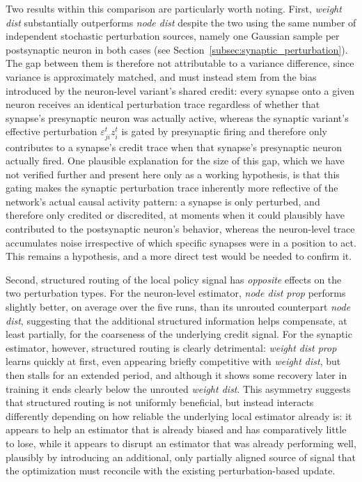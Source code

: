 Two results within this comparison are particularly worth noting. First, \emph{weight dist} substantially outperforms \emph{node dist} despite the two using the same
number of independent stochastic perturbation sources, namely one Gaussian sample per
postsynaptic neuron in both cases (see Section~\ref{subsec:synaptic_perturbation}). The gap
between them is therefore not attributable to a variance difference, since variance is
approximately matched, and must instead stem from the bias introduced by the neuron-level
variant's shared credit: every synapse onto a given neuron receives an identical
perturbation trace regardless of whether that synapse's presynaptic neuron was actually
active, whereas the synaptic variant's effective perturbation $\varepsilon^t_{ji}z^t_i$ is
gated by presynaptic firing and therefore only contributes to a synapse's credit trace when
that synapse's presynaptic neuron actually fired. One plausible explanation for the size of
this gap, which we have not verified further and present here only as a working hypothesis,
is that this gating makes the synaptic perturbation trace inherently more reflective of the
network's actual causal activity pattern: a synapse is only perturbed, and therefore only
credited or discredited, at moments when it could plausibly have contributed to the
postsynaptic neuron's behavior, whereas the neuron-level trace accumulates noise
irrespective of which specific synapses were in a position to act. This remains a hypothesis, and a more direct test would be needed to confirm it.

Second, structured routing of the local policy signal has \emph{opposite} effects on the two
perturbation types. For the neuron-level estimator, \emph{node dist prop} performs
slightly better, on average over the five runs, than its unrouted counterpart \emph{node
dist}, suggesting that the additional structured information helps compensate, at least
partially, for the coarseness of the underlying credit signal. For the synaptic estimator,
however, structured routing is clearly detrimental: \emph{weight dist prop} learns quickly
at first, even appearing briefly competitive with \emph{weight dist}, but then stalls
for an extended period, and although it shows some recovery later in training it ends clearly
below the unrouted \emph{weight dist}. This asymmetry suggests that structured routing
is not uniformly beneficial, but instead interacts differently depending on how reliable the
underlying local estimator already is: it appears to help an estimator that is already biased
and has comparatively little to lose, while it appears to disrupt an estimator that was
already performing well, plausibly by introducing an additional, only partially aligned source
of signal that the optimization must reconcile with the existing perturbation-based update.

